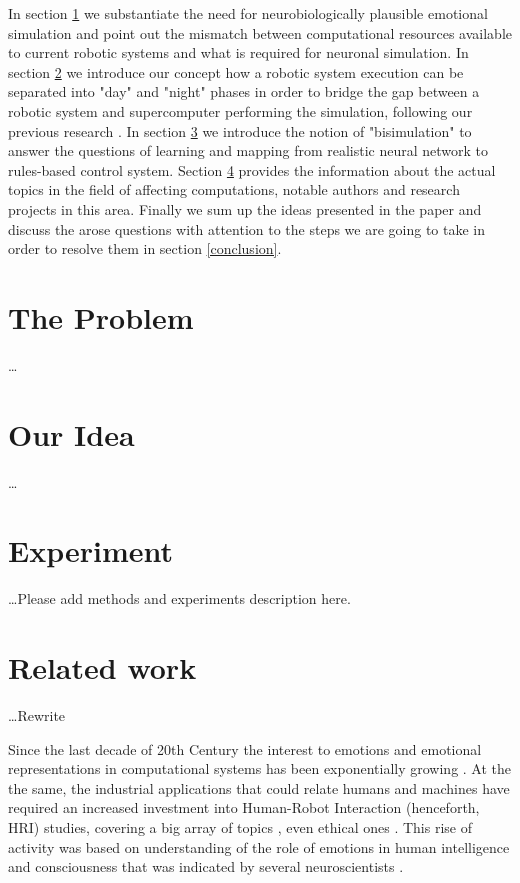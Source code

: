 \documentclass[oribibl]{llncs}
\begin{document}
In section \ref{the-problem} we substantiate the need for neurobiologically plausible
emotional simulation and point out the mismatch between computational resources
available to current robotic systems and what is required for neuronal simulation.
In section \ref{my-idea} we introduce our concept how a robotic system execution
can be separated into "day" and "night" phases in order to bridge the gap
between a robotic system and supercomputer performing the simulation, following our previous research \cite{dream} .
In section \ref{the-details} we introduce the notion of "bisimulation" to answer
the questions of learning and mapping from realistic neural network to rules-based
control system.
Section \ref{related-work} provides the information about the actual topics
in the field of affecting computations, notable authors and research projects
in this area.
Finally we sum up the ideas presented in the paper and discuss the arose questions
with attention to the steps we are going to take in order to resolve them in
section \ref{conclusion}.


\section{The Problem}\label{the-problem}

\ldots

\section{Our Idea}\label{my-idea}

\ldots

\section{Experiment}\label{the-details}

\ldots Please add methods and experiments description here.

\section{Related work}\label{related-work}

\ldots Rewrite

Since the last decade of 20th Century the interest to emotions and emotional representations in computational systems has been exponentially growing \cite{kismet,affectivecomputing,affectivecomputingchallanges,whatdoesitmeanforcomputer}. At the the same, the industrial applications that could relate humans and machines have required an increased investment into Human-Robot Interaction (henceforth, HRI) studies, covering a big array of topics\cite{nonverbalhri}\cite{believable}  \cite{affordance}, even ethical ones \cite{moral}\cite{operto}.
This rise of activity was based on understanding of the role of emotions in human
intelligence and consciousness that was indicated by several neuroscientists
\cite{Damasio1998,Damasio1999,f5}. 
\end{document}
